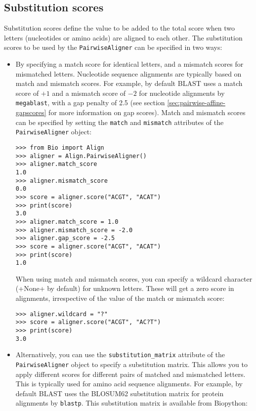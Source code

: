 \subsection{Substitution scores}
\label{sec:pairwise-substitution-scores}

Substitution scores define the value to be added to the total score when two letters (nucleotides or amino acids) are aligned to each other. The substitution scores to be used by the \verb+PairwiseAligner+ can be specified in two ways:

\begin{itemize}
\item By specifying a match score for identical letters, and a mismatch scores for mismatched letters. Nucleotide sequence alignments are typically based on match and mismatch scores. For example, by default BLAST \cite{altschul1990} uses a match score of $+1$ and a mismatch score of $-2$ for nucleotide alignments by \verb+megablast+, with a gap penalty of 2.5 (see section \ref{sec:pairwise-affine-gapscores} for more information on gap scores). Match and mismatch scores can be specified by setting the \verb+match+ and \verb+mismatch+ attributes of the \verb+PairwiseAligner+ object:

\begin{verbatim}
>>> from Bio import Align
>>> aligner = Align.PairwiseAligner()
>>> aligner.match_score
1.0
>>> aligner.mismatch_score
0.0
>>> score = aligner.score("ACGT", "ACAT")
>>> print(score)
3.0
>>> aligner.match_score = 1.0
>>> aligner.mismatch_score = -2.0
>>> aligner.gap_score = -2.5
>>> score = aligner.score("ACGT", "ACAT")
>>> print(score)
1.0
\end{verbatim}
When using match and mismatch scores, you can specify a wildcard character (+None+ by default) for unknown letters. These will get a zero score in alignments, irrespective of the value of the match or mismatch score:
\begin{verbatim}
>>> aligner.wildcard = "?"
>>> score = aligner.score("ACGT", "AC?T")
>>> print(score)
3.0
\end{verbatim}
\item
Alternatively, you can use the \verb+substitution_matrix+ attribute of the \verb+PairwiseAligner+ object to specify a substitution matrix. This allows you to apply different scores for different pairs of matched and mismatched letters. This is typically used for amino acid sequence alignments. For example, by default BLAST \cite{altschul1990} uses the BLOSUM62 substitution matrix for protein alignments by \verb+blastp+. This substitution matrix is available from Biopython:


\end{itemize}
